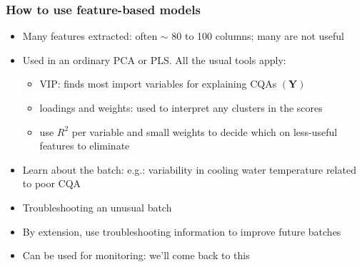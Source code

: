 \begin{frame}\frametitle{How to use feature-based models}

\begin{itemize}
	\item	Many features extracted: often \( \sim \) 80 to 100 columns; many are not useful
	
	\item	Used in an ordinary PCA or PLS.  All the usual tools apply:
	
			\begin{itemize}
				\item	VIP: finds most import variables for explaining CQAs \( (\mathbf{Y}) \)
				
				\item	loadings and weights: used to interpret any clusters in the scores
				
				\item	use \( R^2 \) per variable and small weights to decide which on less-useful features to eliminate
			\end{itemize}\pause
	
	\item	Learn about the batch: {\small e.g.: variability in cooling water temperature related to poor CQA}
	
	\item	Troubleshooting an unusual batch 

	\item	By extension, use troubleshooting information to improve future batches \pause
	
	\item	Can be used for monitoring: we'll come back to this
\end{itemize}
\end{frame}

